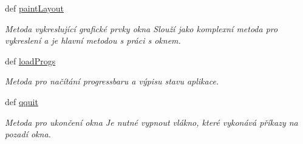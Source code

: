 \begin{DoxyCompactItemize}
def \hyperlink{classmnRepair_1_1App_a6cf047a184898cb1292ae1bd1ccaf13a}{paint\-Layout}
\begin{DoxyCompactList}\small\item\em Metoda vykreslující grafické prvky okna Slouží jako komplexní metoda pro vykreslení a je hlavní metodou s práci s oknem. \end{DoxyCompactList}\item 
def \hyperlink{classmnRepair_1_1App_a963ecf0c9c288defa111ff9500e27674}{load\-Progs}
\begin{DoxyCompactList}\small\item\em Metoda pro načítání progressbaru a výpisu stavu aplikace. \end{DoxyCompactList}\item 
def \hyperlink{classmnRepair_1_1App_aab47754f19f445adbd8723030d1b93ef}{qquit}
\begin{DoxyCompactList}\small\item\em Metoda pro ukončení okna Je nutné vypnout vlákno, které vykonává příkazy na pozadí okna. \end{DoxyCompactList}\end{DoxyCompactItemize}
